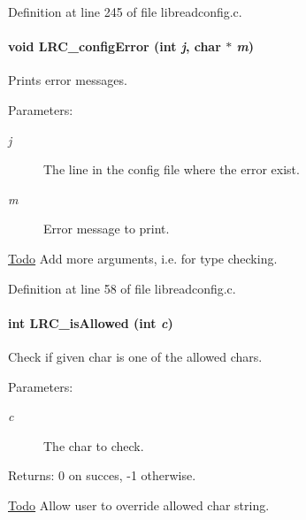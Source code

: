 Definition at line 245 of file libreadconfig.c.\hypertarget{group___l_r_c__internals_g0768167abe6a143840f26439a86ec79d}{
\paragraph[{LRC\_\-configError}]{\setlength{\rightskip}{0pt plus 5cm}void LRC\_\-configError (int {\em j}, \/  char $\ast$ {\em m})}\hfill}
\label{group___l_r_c__internals_g0768167abe6a143840f26439a86ec79d}


Prints error messages. 

\begin{Desc}
\item[Parameters:]
\begin{description}
\item[{\em j}]The line in the config file where the error exist.\item[{\em m}]Error message to print.\end{description}
\end{Desc}
\begin{Desc}
\item[\hyperlink{todo__todo000001}{Todo}]Add more arguments, i.e. for type checking.\end{Desc}


Definition at line 58 of file libreadconfig.c.\hypertarget{group___l_r_c__internals_g6ac7bc617b346047519f4c3589a311bd}{
\paragraph[{LRC\_\-isAllowed}]{\setlength{\rightskip}{0pt plus 5cm}int LRC\_\-isAllowed (int {\em c})}\hfill}
\label{group___l_r_c__internals_g6ac7bc617b346047519f4c3589a311bd}


Check if given char is one of the allowed chars. 

\begin{Desc}
\item[Parameters:]
\begin{description}
\item[{\em c}]The char to check.\end{description}
\end{Desc}
\begin{Desc}
\item[Returns:]0 on succes, -1 otherwise.\end{Desc}
\begin{Desc}
\item[\hyperlink{todo__todo000002}{Todo}]Allow user to override allowed char string. \end{Desc}


